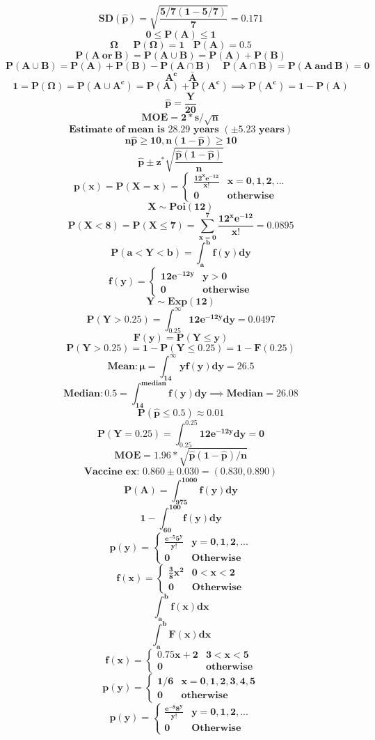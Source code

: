 \documentclass[12pt,portrait,semhelv,semrot]{article}
\begin{document}
{{$$\boldsymbol{SD(\hat{p}) = \sqrt{\frac{5/7(1-5/7)}{7}}=0.171}$$
$$\boldsymbol{0 \leq P(A) \leq 1}$$
$$\boldsymbol{\Omega~~~~~~~P(\Omega) = 1~~~~P(A) = 0.5}$$
$$\boldsymbol{P(A~or~B) = P(A\cup B) = P(A)+P(B)}$$
$$\boldsymbol{P(A\cup B) = P(A)+P(B)- P(A\cap B)~~~~~P(A\cap B) = P(A~and~B) = 0}$$
$$\boldsymbol{A^c~~~~~\bar{A}}$$
$$\boldsymbol{1 = P(\Omega) = P(A\cup A^c) = P(A)+P(A^c) \implies P(A^c) = 1-P(A)}$$
$$\boldsymbol{\hat{p} = \frac{Y}{20}}$$
$$\boldsymbol{MOE = 2*s/\sqrt{n}}$$
$$\boldsymbol{\mbox{Estimate of mean is } 28.29 \mbox{ years } (\pm 5.23 \mbox{ years})}$$
$$\boldsymbol{n\hat{p}\geq 10, n(1-\hat{p})\geq 10}$$  
$$\boldsymbol{\hat{p}\pm z^{*} \sqrt{\frac{\hat{p}(1-\hat{p})}{n}}}$$
$$\boldsymbol{p(x) = P(X=x) = \begin{cases} \frac{12^x e^{-12}}{x!} & x = 0, 1, 2, ... \\ 0 & \mbox{otherwise}\end{cases}}$$
$$\boldsymbol{X\sim Poi(12)}$$
$$\boldsymbol{P(X<8) = P(X\leq 7) = \sum_{x=0}^{7}\frac{12^x e^{-12}}{x!} = 0.0895}$$
$$\boldsymbol{P(a < Y < b) = \int_a^b f(y)dy}$$
$$\boldsymbol{f(y) = \begin{cases} 12e^{-12y} & y > 0 \\ 0 & \mbox{otherwise}\end{cases}}$$
$$\boldsymbol{Y\sim Exp(12)}$$
$$\boldsymbol{P(Y > 0.25) = \int_{0.25}^{\infty} 12e^{-12y}dy = 0.0497}$$
$$\boldsymbol{F(y) = P(Y\leq y)}$$
$$\boldsymbol{P(Y > 0.25) = 1-P(Y\leq 0.25) = 1 - F(0.25)}$$
$$\boldsymbol{Mean: \mu = \int_{14}^{\infty} y f(y)dy = 26.5}$$
$$\boldsymbol{Median:  0.5 = \int_{14}^{median} f(y)dy \implies Median = 26.08}$$
$$\boldsymbol{P(\hat{p}\leq 0.5)\approx 0.01}$$
$$\boldsymbol{P(Y = 0.25) = \int_{0.25}^{0.25} 12e^{-12y}dy = 0}$$
$$\boldsymbol{MOE = 1.96*\sqrt{\hat{p}(1-\hat{p})/n}}$$
$$\boldsymbol{\mbox{Vaccine ex: } 0.860 \pm 0.030 = (0.830, 0.890)}$$
$$\boldsymbol{P(A) = \int_{975}^{1000}f(y)dy}$$
$$\boldsymbol{1- \int_{60}^{100}f(y)dy}$$
$$\boldsymbol{p(y) = \begin{cases}\frac{e^{-5}5^y}{y!} & y = 0, 1, 2, ...\\ 0 & Otherwise\end{cases}}$$
$$\boldsymbol{f(x) = \begin{cases}\frac{3}{8}x^2 & 0 < x < 2\\ 0 & Otherwise\end{cases}}$$
$$\boldsymbol{\int_a^b f(x)dx}$$
$$\boldsymbol{\int_a^b F(x)dx}$$
$$\boldsymbol{f(x) = \begin{cases} 0.75x + 2 & 3 < x< 5\\0 & otherwise\end{cases}}$$
$$\boldsymbol{p(y) = \begin{cases} 1/6 & x = 0,1 ,2, 3, 4, 5\\0 & otherwise\end{cases}}$$
$$\boldsymbol{p(y) = \begin{cases}\frac{e^{-8}8^y}{y!} & y = 0, 1, 2, ...\\ 0 & Otherwise\end{cases}}$$
}}
\end{document}
